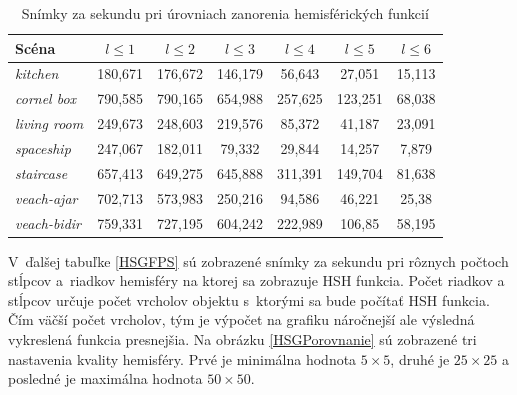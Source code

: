 \begin{table}[h!] \label{HSHFPS}
\centering
\begin{tabular}{|l|c|c|c|c|c|c|}
\hline
\textbf{Scéna} &$l \leq 1$ & $l \leq 2$ & $l \leq 3$ & $l \leq 4$ & $l \leq 5$ & $l \leq 6$   \\ \hline
\textit{kitchen} & 180,671 & 176,672 & 146,179 & 56,643 & 27,051 & 15,113 \\ \hline
\textit{cornel box} & 790,585 & 790,165 & 654,988 & 257,625 & 123,251 & 68,038 \\ \hline
\textit{living room} & 249,673 & 248,603 & 219,576 & 85,372 & 41,187 & 23,091 \\ \hline
\textit{spaceship} & 247,067 & 182,011 & 79,332 & 29,844 & 14,257 & 7,879 \\ \hline
\textit{staircase} & 657,413 & 649,275 & 645,888 & 311,391 & 149,704 & 81,638 \\ \hline
\textit{veach-ajar} & 702,713 & 573,983 & 250,216 & 94,586 & 46,221 & 25,38 \\ \hline
\textit{veach-bidir} & 759,331 & 727,195 & 604,242 & 222,989 & 106,85 & 58,195 \\ \hline
\end{tabular}
\caption{Snímky za sekundu pri úrovniach zanorenia hemisférických funkcií}
\end{table}

V~ďalšej tabuľke \ref{HSGFPS} sú zobrazené snímky za sekundu pri rôznych počtoch stĺpcov a~riadkov hemisféry na ktorej sa zobrazuje HSH funkcia. Počet riadkov a stĺpcov určuje počet vrcholov objektu s~ktorými sa bude počítať HSH funkcia. Čím väčší počet vrcholov, tým je výpočet na grafiku náročnejší ale výsledná vykreslená funkcia presnejšia. Na obrázku \ref{HSGPorovnanie} sú zobrazené tri nastavenia kvality hemisféry. Prvé je minimálna hodnota $5 \times 5$, druhé je $25 \times 25$ a posledné je maximálna hodnota $50 \times 50$.

